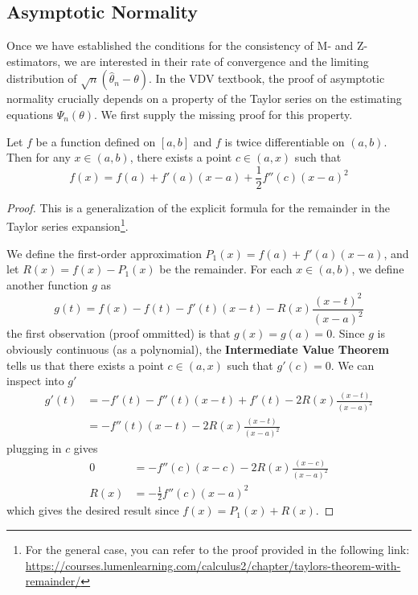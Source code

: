 \documentclass{article}
\begin{document}
\subsection{Asymptotic Normality}
Once we have established the conditions for the consistency of M- and Z-estimators, we are interested in their rate of convergence and the limiting distribution of $\sqrt{n}(\hat{\theta}_n - \theta)$. In the VDV textbook, the proof of asymptotic normality crucially depends on a property of the Taylor series on the estimating equations $\Psi_n(\theta)$. We first supply the missing proof for this property.
\begin{lemma}\label{lemma:taylor_remainder}
    Let $f$ be a function defined on $[a, b]$ and $f$ is twice differentiable on $(a, b)$. Then for any $x \in (a, b)$, there exists a point $c \in (a, x)$ such that
    \begin{equation}
        f(x) = f(a) + f'(a)(x - a) + \frac{1}{2}f''(c)(x - a)^2
    \end{equation}
\end{lemma}
\begin{proof}
    This is a generalization of the explicit formula for the remainder in the Taylor series expansion\footnote{For the general case, you can refer to the proof provided in the following link: \url{https://courses.lumenlearning.com/calculus2/chapter/taylors-theorem-with-remainder/}}.

    We define the first-order approximation $P_1(x) = f(a) + f'(a)(x - a)$, and let $R(x) = f(x) - P_1(x)$ be the remainder. For each $x \in (a, b)$, we define another function $g$ as
    \begin{equation}
        g(t) = f(x) - f(t) - f'(t)(x - t) - R(x)\frac{(x-t)^2}{(x-a)^2}
    \end{equation}
    the first observation (proof ommitted) is that $g(x) = g(a) = 0$. Since $g$ is obviously continuous (as a polynomial), the \textbf{Intermediate Value Theorem} tells us that there exists a point $c \in (a, x)$ such that $g'(c) = 0$. We can inspect into $g'$
    \begin{align}
        g'(t) &= -f'(t) - f''(t)(x - t) + f'(t) - 2R(x)\frac{(x-t)}{(x-a)^2} \\
        &= -f''(t)(x - t) - 2R(x)\frac{(x-t)}{(x-a)^2}
    \end{align}
    plugging in $c$ gives
    \begin{align}
        0 &= -f''(c)(x - c) - 2R(x)\frac{(x-c)}{(x-a)^2} \\
        R(x) &= -\frac{1}{2}f''(c)(x - a)^2
    \end{align}
    which gives the desired result since $f(x) = P_1(x) + R(x)$.
\end{proof}
\end{document}
